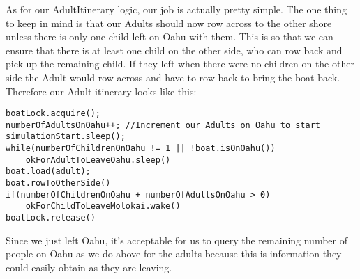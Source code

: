 \documentclass{article}
\begin{document}
As for our AdultItinerary logic, our job is actually pretty simple. The one thing to keep in mind is that our Adults
should now row across to the other shore unless there is only one child left on Oahu with them. This is so that we can
ensure that there is at least one child on the other side, who can row back and pick up the remaining child. If they
left when there were no children on the other side the Adult would row across and have to row back to bring the boat
back. Therefore our Adult itinerary looks like this:
\begin{lstlisting}
boatLock.acquire();
numberOfAdultsOnOahu++; //Increment our Adults on Oahu to start
simulationStart.sleep();
while(numberOfChildrenOnOahu != 1 || !boat.isOnOahu())
    okForAdultToLeaveOahu.sleep()
boat.load(adult);
boat.rowToOtherSide()
if(numberOfChildrenOnOahu + numberOfAdultsOnOahu > 0)
    okForChildToLeaveMolokai.wake()
boatLock.release()
\end{lstlisting}
Since we just left Oahu, it's acceptable for us to query the remaining number of people on Oahu as we do above for the
adults because this is information they could easily obtain as they are leaving.
\end{document}
